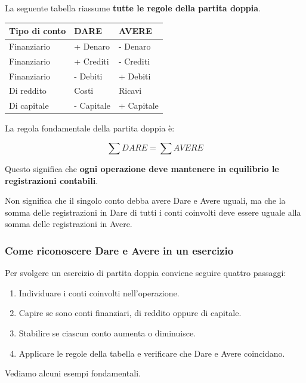 \noindent La seguente tabella riassume
\textbf{tutte le regole della partita doppia}.

\begin{center}
\renewcommand{\arraystretch}{1.3}
\begin{tabular}{|l|l|l|}
\hline
\textbf{Tipo di conto} &
\textbf{DARE} &
\textbf{AVERE} \\
\hline
Finanziario & + Denaro & - Denaro \\
\hline
Finanziario & + Crediti & - Crediti \\
\hline
Finanziario & - Debiti & + Debiti \\
\hline
Di reddito & Costi & Ricavi \\
\hline
Di capitale & - Capitale & + Capitale \\
\hline
\end{tabular}
\end{center}

\noindent La regola fondamentale della partita doppia è:

\[
\boxed{
\sum DARE=\sum AVERE
}
\]

\noindent Questo significa che \textbf{ogni operazione
deve mantenere in equilibrio le registrazioni contabili}.

\medskip

\noindent Non significa che il singolo conto debba avere
Dare e Avere uguali, ma che la somma delle registrazioni
in Dare di tutti i conti coinvolti deve essere
uguale alla somma delle registrazioni in Avere.


\subsubsection*{Come riconoscere Dare e Avere in un esercizio}

\noindent Per svolgere un esercizio di partita doppia
conviene seguire quattro passaggi:

\begin{enumerate}
    \item Individuare i conti coinvolti nell'operazione.
    \item Capire se sono conti finanziari, di reddito
    oppure di capitale.
    \item Stabilire se ciascun conto aumenta o diminuisce.
    \item Applicare le regole della tabella
    e verificare che Dare e Avere coincidano.
\end{enumerate}

\noindent Vediamo alcuni esempi fondamentali.


